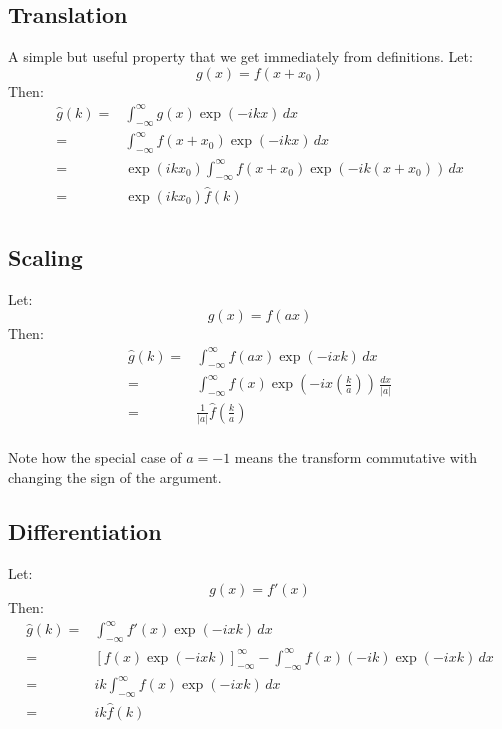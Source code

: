 \subsection{Translation}
A simple but useful property that we get immediately from definitions.
Let:
\[g(x) = f(x+x_0)\]
Then:
\begin{equation*}
\begin{aligned}
\hat{g}(k) =& \int_{-\infty}^{\infty}g(x)\exp(-ikx)\,dx\\
=& \int_{-\infty}^{\infty}f(x+x_0)\exp(-ikx)\,dx\\
=&\exp(ikx_0) \int_{-\infty}^{\infty}f(x+x_0)\exp(-ik(x+x_0))\,dx\\
=&\exp(ikx_0) \hat{f}(k)\\
\end{aligned}
\end{equation*}

\subsection{Scaling}
Let:
\[g(x) = f(ax) \]
Then:
\begin{equation*}
\begin{aligned}
	\hat{g}(k) =& \int_{-\infty}^{\infty}f(ax)\exp(-ixk)\,dx\\
	=& \int_{-\infty}^{\infty}f(x)\exp\left(-ix\left(\frac{k}{a}\right)\right)\,\frac{dx}{|a|}\\
	=& \frac{1}{|a|}\hat{f}\left(\frac{k}{a}\right) \\
\end{aligned}
\end{equation*}

Note how the special case of $a=-1$ means the transform commutative with changing the sign of the argument.

\subsection{Differentiation} 
Let:
\[g(x) = f'(x)\]
Then:
\begin{equation*}
\begin{aligned}
	\hat{g}(k) =& \int_{-\infty}^{\infty}f'(x)\exp(-ixk)\,dx\\
	=& \left[f(x)\exp(-ixk)\right]_{-\infty}^{\infty}-\int_{-\infty}^{\infty}f(x)(-ik)\exp(-ixk)\,dx\\
	=&ik\int_{-\infty}^{\infty}f(x)\exp(-ixk)\,dx\\
	=& ik\hat{f}(k) \\
\end{aligned}
\end{equation*}

